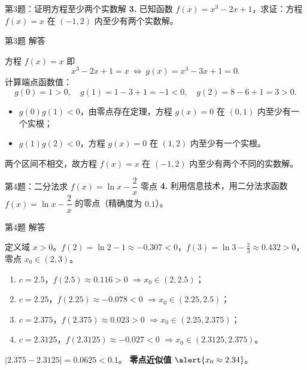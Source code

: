 \documentclass[10pt,aspectratio=169,serif]{beamer}
\begin{document}
\begin{frame}[t]{第3题：证明方程至少两个实数解}
\textbf{3.} 已知函数 $f(x)=x^{3}-2x+1$，求证：方程 $f(x)=x$ 在 $(-1,2)$ 内至少有两个实数解。
\end{frame}

\begin{frame}[t]{第3题 解答}
\begin{tcolorbox}[colback=orange!10,colframe=orange,title=\textbf{证明}]
方程 $f(x)=x$ 即
\[
x^{3}-2x+1=x\ \Longleftrightarrow\ g(x)=x^{3}-3x+1=0.
\]
计算端点函数值：
\[
g(0)=1>0,\quad g(1)=1-3+1=-1<0,\quad g(2)=8-6+1=3>0.
\]
\smallskip
\begin{itemize}
  \item $g(0)g(1)<0$，由零点存在定理，方程 $g(x)=0$ 在 $(0,1)$ 内至少有一个实根；
  \item $g(1)g(2)<0$，方程 $g(x)=0$ 在 $(1,2)$ 内至少有一个实根。
\end{itemize}
两个区间不相交，故方程 $f(x)=x$ 在 $(-1,2)$ 内\alert{至少有两个不同的实数解}。
\end{tcolorbox}
\end{frame}

\begin{frame}[t]{第4题：二分法求 $f(x)=\ln x-\dfrac{2}{x}$ 零点}
\textbf{4.} 利用信息技术，用二分法求函数 $f(x)=\ln x-\dfrac{2}{x}$ 的零点（精确度为 $0.1$）。
\end{frame}

\begin{frame}[t]{第4题 解答}
\vspace{-1em}
\begin{tcolorbox}[colback=orange!10,colframe=orange,title=\textbf{解}]
定义域 $x>0$。$f(2)=\ln 2-1\approx -0.307<0$，$f(3)=\ln 3-\tfrac{2}{3}\approx 0.432>0$，零点 $x_{0}\in(2,3)$。
\smallskip
\begin{enumerate}
  \item $c=2.5$，$f(2.5)\approx 0.116>0$ $\Rightarrow x_{0}\in(2,2.5)$；
  \item $c=2.25$，$f(2.25)\approx -0.078<0$ $\Rightarrow x_{0}\in(2.25,2.5)$；
  \item $c=2.375$，$f(2.375)\approx 0.023>0$ $\Rightarrow x_{0}\in(2.25,2.375)$；
  \item $c=2.3125$，$f(2.3125)\approx -0.027<0$ $\Rightarrow x_{0}\in(2.3125,2.375)$。
\end{enumerate}
$|2.375-2.3125|=0.0625<0.1$。
\smallskip
\textbf{零点近似值 } $\alert{x_{0}\approx 2.34}$。
\end{tcolorbox}
\end{frame}
\end{document}
